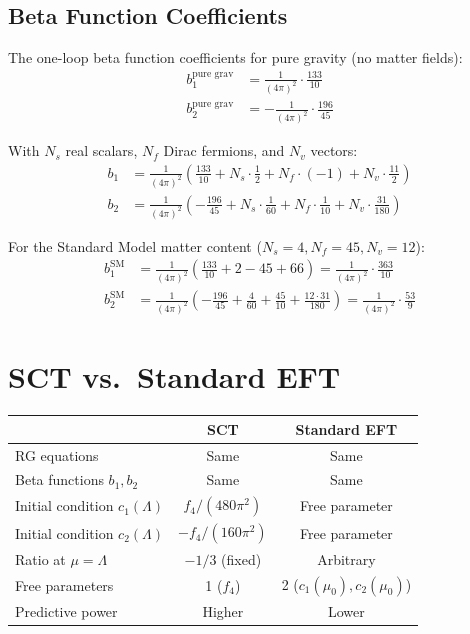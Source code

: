 \documentclass[11pt,a4paper]{article}
\begin{document}
\subsection{Beta Function Coefficients}

The one-loop beta function coefficients for pure gravity (no matter fields):
\begin{align}
  b_1^{\text{pure grav}} &= \frac{1}{(4\pi)^2}\cdot\frac{133}{10} \\
  b_2^{\text{pure grav}} &= -\frac{1}{(4\pi)^2}\cdot\frac{196}{45}
\end{align}

With $N_s$ real scalars, $N_f$ Dirac fermions, and $N_v$ vectors:
\begin{align}
  b_1 &= \frac{1}{(4\pi)^2}\left(\frac{133}{10} + N_s\cdot\frac{1}{2} + N_f\cdot(-1) + N_v\cdot\frac{11}{2}\right) \\
  b_2 &= \frac{1}{(4\pi)^2}\left(-\frac{196}{45} + N_s\cdot\frac{1}{60} + N_f\cdot\frac{1}{10} + N_v\cdot\frac{31}{180}\right)
\end{align}

For the Standard Model matter content ($N_s = 4, N_f = 45, N_v = 12$):
\begin{align}
  b_1^{\text{SM}} &= \frac{1}{(4\pi)^2}\left(\frac{133}{10} + 2 - 45 + 66\right) = \frac{1}{(4\pi)^2}\cdot\frac{363}{10} \\
  b_2^{\text{SM}} &= \frac{1}{(4\pi)^2}\left(-\frac{196}{45} + \frac{4}{60} + \frac{45}{10} + \frac{12\cdot 31}{180}\right) = \frac{1}{(4\pi)^2}\cdot\frac{53}{9}
\end{align}

\section{SCT vs.\ Standard EFT}

\begin{center}
\renewcommand{\arraystretch}{1.4}
\begin{tabular}{p{4.5cm}cc}
  \toprule
  & \textbf{SCT} & \textbf{Standard EFT} \\
  \midrule
  RG equations & Same & Same \\
  Beta functions $b_1, b_2$ & Same & Same \\
  Initial condition $c_1(\Lambda)$ & $f_4/(480\pi^2)$ & Free parameter \\
  Initial condition $c_2(\Lambda)$ & $-f_4/(160\pi^2)$ & Free parameter \\
  Ratio at $\mu = \Lambda$ & $-1/3$ (fixed) & Arbitrary \\
  Free parameters & 1 ($f_4$) & 2 ($c_1(\mu_0), c_2(\mu_0)$) \\
  Predictive power & Higher & Lower \\
  \bottomrule
\end{tabular}
\end{center}
\end{document}
